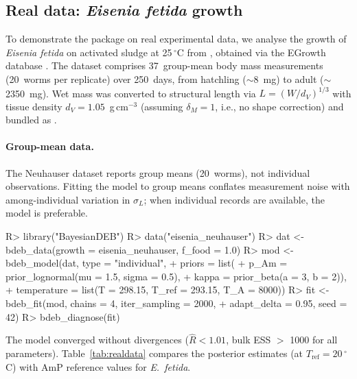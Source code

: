 \documentclass[article,shortnames]{jss}
\begin{document}
\subsection[Real data: Eisenia fetida growth]{Real data:
  \emph{Eisenia fetida} growth} \label{sec:realdata}

To demonstrate the package on real experimental data, we analyse
the growth of \emph{Eisenia fetida} on activated sludge at 25\,$^\circ$C
from \citet{Neuhauser1980}, obtained via the EGrowth database
\citep{MathieuEGrowth2018}.  The dataset comprises 37~group-mean
body mass measurements (20~worms per replicate) over 250~days, from
hatchling ($\sim$8~mg) to adult ($\sim$2350~mg).  Wet mass was
converted to structural length via $L = (W / d_V)^{1/3}$ with tissue
density $d_V = 1.05$~g\,cm$^{-3}$ (assuming $\delta_M = 1$, i.e., no
shape correction) and bundled as .

\paragraph{Group-mean data.}
The Neuhauser dataset reports group means (20~worms), not
individual observations.  Fitting the  model to
group means conflates measurement noise with among-individual
variation in $\sigma_L$; when individual records are available,
the  model is preferable.

\begin{CodeChunk}
\begin{CodeInput}
R> library("BayesianDEB")
R> data("eisenia_neuhauser")
R> dat <- bdeb_data(growth = eisenia_neuhauser, f_food = 1.0)
R> mod <- bdeb_model(dat, type = "individual",
+    priors = list(
+      p_Am  = prior_lognormal(mu = 1.5, sigma = 0.5),
+      kappa = prior_beta(a = 3, b = 2)),
+    temperature = list(T = 298.15, T_ref = 293.15, T_A = 8000))
R> fit <- bdeb_fit(mod, chains = 4, iter_sampling = 2000,
+    adapt_delta = 0.95, seed = 42)
R> bdeb_diagnose(fit)
\end{CodeInput}
\end{CodeChunk}

The model converged without divergences ($\hat{R} < 1.01$, bulk ESS
$>$ 1000 for all parameters).  Table~\ref{tab:realdata} compares
the posterior estimates (at $T_{\mathrm{ref}} = 20\,^\circ$C) with
AmP reference values for \emph{E.~fetida}.
\end{document}
